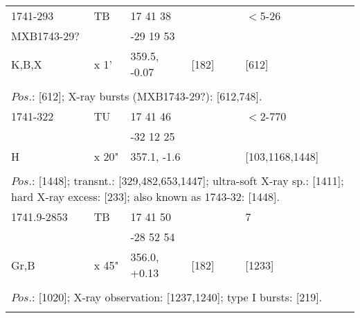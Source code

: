 \documentclass{aa}
\begin{document}
\begin{tabular}{p{2.5cm}p{1cm}p{1.8cm}p{2.3cm}p{3.3cm}p{2.0cm}p{2.2cm}}
\noalign{\smallskip}
1741-293                &  TB         & 17 41 38              &                       &                          & $<$5-26        &            \\
MXB1743-29?      &                 & -29 19 53             &                       &                          &                        &            \\
K,B,X                      & x 1'         & 359.5, -0.07          & [182]            &                          & [612]              &            \\
\\
\multicolumn{7}{p{17.5cm}}{
$Pos$.: [612]; X-ray bursts (MXB1743-29?): [612,748].}\\
\noalign{\smallskip}
\hline

\noalign{\smallskip}
1741-322        & TU                & 17 41 46              &                     &                          & $<$2-770              &           \\
                         &                      & -32 12 25             &                     &                          &                                 &           \\
      H                & x 20"            & 357.1, -1.6           &                     &                          & [103,1168,1448]   &          \\
\\
\multicolumn{7}{p{17.5cm}}{
$Pos$.: [1448]; transnt.: [329,482,653,1447]; ultra-soft X-ray sp.: [1411]; hard X-ray excess: [233]; 
also known as 1743-32: [1448].}\\
\noalign{\smallskip}
\hline

\noalign{\smallskip}
1741.9-2853  & TB       & 17 41 50           &                    &                            & 7               &          \\
                         &             & -28 52 54          &                    &                            &                  &         \\
Gr,B                & x 45"   & 356.0, +0.13    &  [182]         &                            & [1233]      &         \\
\\
\multicolumn{7}{p{17.5cm}}{
$Pos$.: [1020]; X-ray observation: [1237,1240]; type I bursts: [219].}\\
\noalign{\smallskip}
\hline


\end{tabular}
\end{document}
